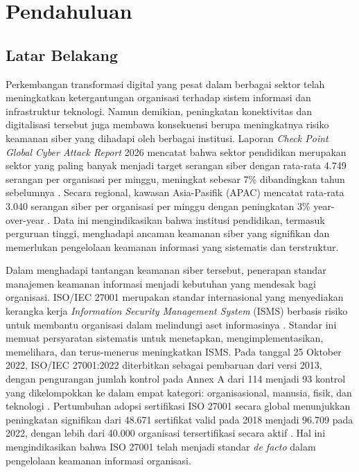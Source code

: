 \documentclass[bachelor,bahasa]{thesisdtetiugm}
\begin{document}
\startmain

\cleardoublepage {}
\chapter{Pendahuluan}
\label{chap:pendahuluan}

\section{Latar Belakang}
\label{sec:latar-belakang}

Perkembangan transformasi digital yang pesat dalam berbagai sektor telah meningkatkan ketergantungan organisasi terhadap sistem informasi dan infrastruktur teknologi. Namun demikian, peningkatan konektivitas dan digitalisasi tersebut juga membawa konsekuensi berupa meningkatnya risiko keamanan siber yang dihadapi oleh berbagai institusi. Laporan \textit{Check Point Global Cyber Attack Report} 2026 mencatat bahwa sektor pendidikan merupakan sektor yang paling banyak menjadi target serangan siber dengan rata-rata 4.749 serangan per organisasi per minggu, meningkat sebesar 7\% dibandingkan tahun sebelumnya \cite{checkpoint2026}. Secara regional, kawasan Asia-Pasifik (APAC) mencatat rata-rata 3.040 serangan siber per organisasi per minggu dengan peningkatan 3\% year-over-year \cite{checkpoint2026}. Data ini mengindikasikan bahwa institusi pendidikan, termasuk perguruan tinggi, menghadapi ancaman keamanan siber yang signifikan dan memerlukan pengelolaan keamanan informasi yang sistematis dan terstruktur.

Dalam menghadapi tantangan keamanan siber tersebut, penerapan standar manajemen keamanan informasi menjadi kebutuhan yang mendesak bagi organisasi. ISO/IEC 27001 merupakan standar internasional yang menyediakan kerangka kerja \textit{Information Security Management System} (ISMS) berbasis risiko untuk membantu organisasi dalam melindungi aset informasinya \cite{iso27001review2022}. Standar ini memuat persyaratan sistematis untuk menetapkan, mengimplementasikan, memelihara, dan terus-menerus meningkatkan ISMS. Pada tanggal 25 Oktober 2022, ISO/IEC 27001:2022 diterbitkan sebagai pembaruan dari versi 2013, dengan pengurangan jumlah kontrol pada Annex A dari 114 menjadi 93 kontrol yang dikelompokkan ke dalam empat kategori: organisasional, manusia, fisik, dan teknologi \cite{iso27001review2022}. Pertumbuhan adopsi sertifikasi ISO 27001 secara global menunjukkan peningkatan signifikan dari 48.671 sertifikat valid pada 2018 menjadi 96.709 pada 2022, dengan lebih dari 40.000 organisasi tersertifikasi secara aktif \cite{frameworkcomparison2024}. Hal ini mengindikasikan bahwa ISO 27001 telah menjadi standar \textit{de facto} dalam pengelolaan keamanan informasi organisasi.
\end{document}
